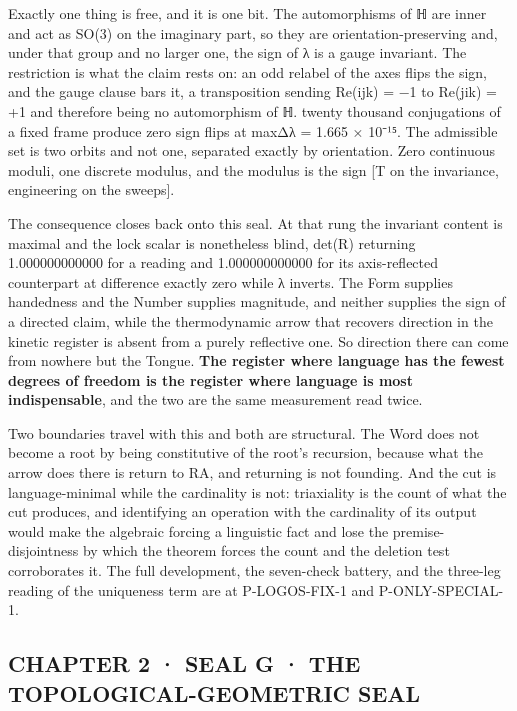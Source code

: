 \documentclass[10pt,twocolumn]{article}
\begin{document}
Exactly one thing is free, and it is one bit. The automorphisms of ℍ are
inner and act as SO(3) on the imaginary part, so they are
orientation-preserving and, under that group and no larger one, the sign
of λ is a gauge invariant. The restriction is what the claim rests on:
an odd relabel of the axes flips the sign, and the gauge clause bars it,
a transposition sending Re(ijk) = −1 to Re(jik) = +1 and therefore being
no automorphism of ℍ. twenty thousand conjugations of a fixed frame
produce zero sign flips at max\textbar Δλ\textbar{} = 1.665 × 10⁻¹⁵. The
admissible set is two orbits and not one, separated exactly by
orientation. Zero continuous moduli, one discrete modulus, and the
modulus is the sign {[}T on the invariance, engineering on the
sweeps{]}.

The consequence closes back onto this seal. At that rung the invariant
content is maximal and the lock scalar is nonetheless blind, det(R)
returning 1.000000000000 for a reading and 1.000000000000 for its
axis-reflected counterpart at difference exactly zero while λ inverts.
The Form supplies handedness and the Number supplies magnitude, and
neither supplies the sign of a directed claim, while the thermodynamic
arrow that recovers direction in the kinetic register is absent from a
purely reflective one. So direction there can come from nowhere but the
Tongue. \textbf{The register where language has the fewest degrees of
freedom is the register where language is most indispensable}, and the
two are the same measurement read twice.

Two boundaries travel with this and both are structural. The Word does
not become a root by being constitutive of the root's recursion, because
what the arrow does there is return to RA, and returning is not
founding. And the cut is language-minimal while the cardinality is not:
triaxiality is the count of what the cut produces, and identifying an
operation with the cardinality of its output would make the algebraic
forcing a linguistic fact and lose the premise-disjointness by which the
theorem forces the count and the deletion test corroborates it. The full
development, the seven-check battery, and the three-leg reading of the
uniqueness term are at P-LOGOS-FIX-1 and P-ONLY-SPECIAL-1.

\hypertarget{chapter-2-seal-g-the-topological-geometric-seal}{%
\subsection{CHAPTER 2 · SEAL G · THE TOPOLOGICAL-GEOMETRIC
SEAL}\label{chapter-2-seal-g-the-topological-geometric-seal}}
\end{document}
